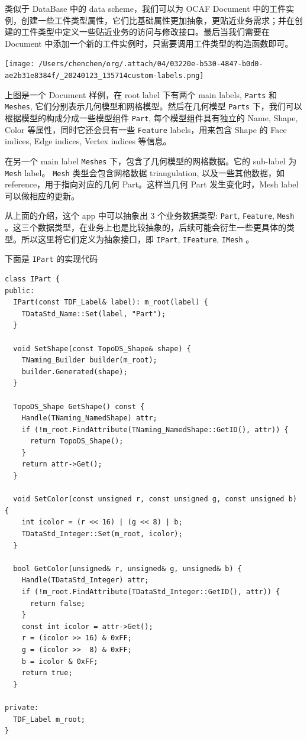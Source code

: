 \documentclass[11pt]{article}
\begin{document}
类似于 DataBase 中的 data scheme，我们可以为 OCAF Document 中的工件实例，创建一些工件类型属性，它们比基础属性更加抽象，更贴近业务需求；并在创建的工件类型中定义一些贴近业务的访问与修改接口。最后当我们需要在 Document 中添加一个新的工件实例时，只需要调用工件类型的构造函数即可。


\begin{center}
\texttt{[image: /Users/chenchen/org/.attach/04/03220e-b530-4847-b0d0-ae2b31e8384f/\_20240123\_135714custom-labels.png]}
\end{center}

上图是一个 Document 样例，在 root label 下有两个 main labels, \texttt{Parts} 和 \texttt{Meshes}, 它们分别表示几何模型和网格模型。然后在几何模型 \texttt{Parts} 下，我们可以根据模型的构成分成一些模型组件 \texttt{Part}, 每个模型组件具有独立的 Name, Shape, Color 等属性，同时它还会具有一些 \texttt{Feature} labels，用来包含 Shape 的 Face indices, Edge indices, Vertex indices 等信息。

在另一个 main label \texttt{Meshes} 下，包含了几何模型的网格数据。它的 sub-label 为 \texttt{Mesh} label。 \texttt{Mesh} 类型会包含网格数据 triangulation, 以及一些其他数据，如 reference，用于指向对应的几何 Part。这样当几何 Part 发生变化时，Mesh label 可以做相应的更新。

从上面的介绍，这个 app 中可以抽象出 3 个业务数据类型: \texttt{Part}, \texttt{Feature}, \texttt{Mesh} 。这三个数据类型，在业务上也是比较抽象的，后续可能会衍生一些更具体的类型。所以这里将它们定义为抽象接口，即 \texttt{IPart}, \texttt{IFeature}, \texttt{IMesh} 。

下面是 \texttt{IPart} 的实现代码

\begin{verbatim}
class IPart {
public:
  IPart(const TDF_Label& label): m_root(label) {
    TDataStd_Name::Set(label, "Part");
  }

  void SetShape(const TopoDS_Shape& shape) {
    TNaming_Builder builder(m_root);
    builder.Generated(shape);
  }

  TopoDS_Shape GetShape() const {
    Handle(TNaming_NamedShape) attr;
    if (!m_root.FindAttribute(TNaming_NamedShape::GetID(), attr)) {
      return TopoDS_Shape();
    }
    return attr->Get();
  }

  void SetColor(const unsigned r, const unsigned g, const unsigned b) {
    int icolor = (r << 16) | (g << 8) | b;
    TDataStd_Integer::Set(m_root, icolor);
  }

  bool GetColor(unsigned& r, unsigned& g, unsigned& b) {
    Handle(TDataStd_Integer) attr;
    if (!m_root.FindAttribute(TDataStd_Integer::GetID(), attr)) {
      return false;
    }
    const int icolor = attr->Get();
    r = (icolor >> 16) & 0xFF;
    g = (icolor >>  8) & 0xFF;
    b = icolor & 0xFF;
    return true;
  }

private:
  TDF_Label m_root;
}
\end{verbatim}
\end{document}
